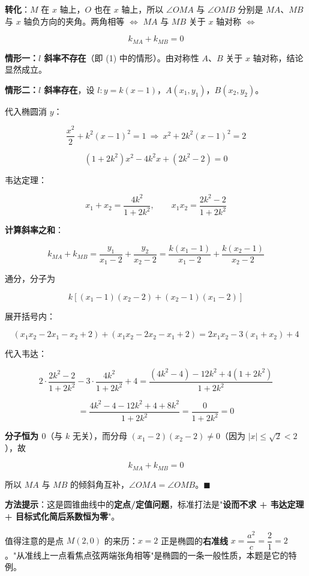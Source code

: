 

\textbf{转化}：$M$ 在 $x$ 轴上，$O$ 也在 $x$ 轴上，所以 $\angle OMA$ 与 $\angle OMB$ 分别是 $MA$、$MB$ 与 $x$ 轴负方向的夹角。两角相等 $\iff$ $MA$ 与 $MB$ 关于 $x$ 轴对称 $\iff$

\[k_{MA}+k_{MB}=0\]

\textbf{情形一：$l$ 斜率不存在}（即 (1) 中的情形）。由对称性 $A$、$B$ 关于 $x$ 轴对称，结论显然成立。

\textbf{情形二：$l$ 斜率存在}，设 $l:y=k(x-1)$，$A\left(x_1,y_1\right)$，$B\left(x_2,y_2\right)$。

代入椭圆消 $y$：

\[\frac{x^{2}}2+k^{2}(x-1)^{2}=1\ \Longrightarrow\ x^{2}+2k^{2}(x-1)^{2}=2\]

\[\left(1+2k^{2}\right)x^{2}-4k^{2}x+\left(2k^{2}-2\right)=0\]

韦达定理：

\[x_1+x_2=\frac{4k^{2}}{1+2k^{2}},\qquad x_1x_2=\frac{2k^{2}-2}{1+2k^{2}}\]

\textbf{计算斜率之和}：

\[k_{MA}+k_{MB}=\frac{y_1}{x_1-2}+\frac{y_2}{x_2-2}=\frac{k\left(x_1-1\right)}{x_1-2}+\frac{k\left(x_2-1\right)}{x_2-2}\]

通分，分子为

\[k\left[\left(x_1-1\right)\left(x_2-2\right)+\left(x_2-1\right)\left(x_1-2\right)\right]\]

展开括号内：

\[\left(x_1x_2-2x_1-x_2+2\right)+\left(x_1x_2-2x_2-x_1+2\right)=2x_1x_2-3\left(x_1+x_2\right)+4\]

代入韦达：

\[2\cdot\frac{2k^{2}-2}{1+2k^{2}}-3\cdot\frac{4k^{2}}{1+2k^{2}}+4=\frac{\left(4k^{2}-4\right)-12k^{2}+4\left(1+2k^{2}\right)}{1+2k^{2}}\]

\[=\frac{4k^{2}-4-12k^{2}+4+8k^{2}}{1+2k^{2}}=\frac{0}{1+2k^{2}}=0\]

\textbf{分子恒为 $0$}（与 $k$ 无关），而分母 $\left(x_1-2\right)\left(x_2-2\right)\ne0$（因为 $|x|\le\sqrt2<2$），故

\[k_{MA}+k_{MB}=0\]

所以 $MA$ 与 $MB$ 的倾斜角互补，$\angle OMA=\angle OMB$。$\blacksquare$

\begin{gktip}
\textbf{方法提示}：这是圆锥曲线中的\textbf{定点/定值问题}，标准打法是"\textbf{设而不求 + 韦达定理 + 目标式化简后系数恒为零}"。

值得注意的是点 $M(2,0)$ 的来历：$x=2$ 正是椭圆的\textbf{右准线} $x=\dfrac{a^{2}}c=\dfrac21=2$。"从准线上一点看焦点弦两端张角相等"是椭圆的一条一般性质，本题是它的特例。
\end{gktip}

